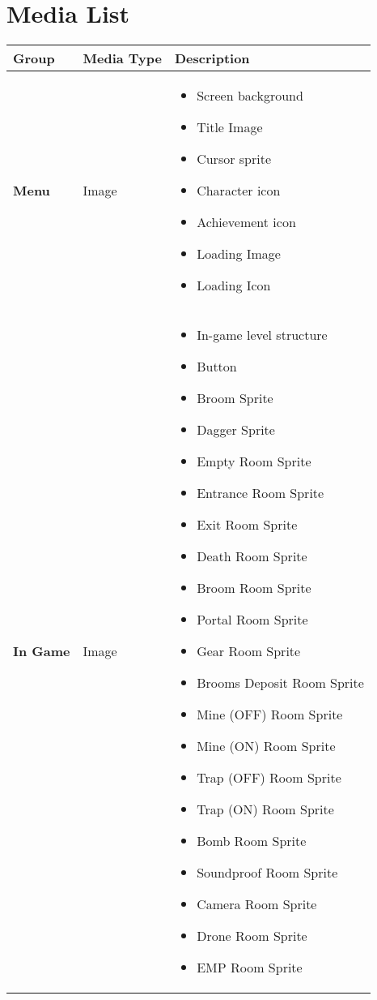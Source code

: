 \section{Media List}

\begin{tabular}{|m{3cm}|m{3cm}|m{7cm}|}
	\hline
	\textbf{Group} & \textbf{Media Type} & \textbf{Description}\\
	\hline
	 \textbf{Menu}& Image & 
	 \begin{itemize}
	 	\item Screen background
	 	\item Title Image
	 	\item Cursor sprite
	 	\item Character icon
	 	\item Achievement icon
	 	\item Loading Image
	 	\item Loading Icon
	 \end{itemize}
	 	\\
    \hline
     \textbf{In Game}& Image & 
     \begin{itemize}
     	\item In-game level structure
     	\item Button
     	\item Broom Sprite
     	\item Dagger Sprite
     	\item Empty Room Sprite
     	\item Entrance Room Sprite
     	\item Exit Room Sprite
     	\item Death Room Sprite
     	\item Broom Room Sprite
     	\item Portal Room Sprite
     	\item Gear Room Sprite
     	\item Brooms Deposit Room Sprite
     	\item Mine (OFF) Room Sprite
     	\item Mine (ON) Room Sprite
     	\item Trap (OFF) Room Sprite
     	\item Trap (ON) Room Sprite
     	\item Bomb Room Sprite
     	\item Soundproof Room Sprite
     	\item Camera Room Sprite
     	\item Drone Room Sprite
     	\item EMP Room Sprite

\end{itemize}
\end{tabular}

